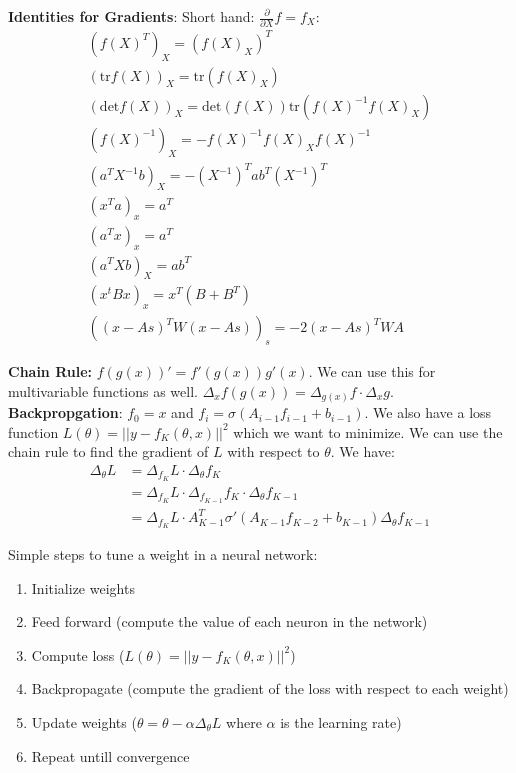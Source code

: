 \documentclass[answers,12pt,addpoints]{exam}
\begin{document}
\textbf{Identities for Gradients}: Short hand: $\frac{\partial}{\partial X} f = f_X$:
\begin{align*}
    (f(X)^T)_X = (f(X)_X)^T \\
    (\text{tr}f(X))_X = \text{tr}(f(X)_X) \\
    (\text{det}f(X))_X = \text{det}(f(X))\text{tr}(f(X)^{-1} f(X)_X) \\
    (f(X)^{-1})_X = -f(X)^{-1} f(X)_X f(X)^{-1} \\
    (a^T X^{-1}b)_X = -(X^{-1})^T ab^T (X^{-1})^T\\
    (x^T a)_x = a^T \\
    (a^T x)_x = a^T\\
    (a^T X b)_X = ab^T \\
    (x^t B x)_x = x^T(B + B^T)\\
    ((x-As)^T W (x-As))_s = -2(x-As)^T W A 
\end{align*}

\textbf{Chain Rule:} $f(g(x))'  = f'(g(x))g'(x)$. We can use this for multivariable functions as well. $\Delta_x f(g(x)) = \Delta_{g(x)} f \cdot \Delta_x g$.\\

\textbf{Backpropgation}: $f_0 =x$ and $f_i = \sigma(A_{i-1}f_{i-1} + b_{i-1})$. We also have a loss function $L(\theta) = ||y - f_K(\theta, x)||^2$ which we want to minimize. We can use the chain rule to find the gradient of $L$ with respect to $\theta$. We have:
\begin{align*}
    \Delta_{\theta} L &= \Delta_{f_K} L \cdot \Delta_{\theta} f_K \\
    &= \Delta_{f_K} L \cdot \Delta_{f_{K-1}} f_K \cdot \Delta_{\theta} f_{K-1} \\
    &= \Delta_{f_K} L \cdot A_{K-1}^T \sigma'(A_{K-1}f_{K-2} + b_{K-1})\Delta_{\theta} f_{K-1}
\end{align*}

\begin{example}
    Simple steps to tune a weight in a neural network:
    \begin{enumerate}
        \item Initialize weights 
        \item Feed forward (compute the value of each neuron in the network)
        \item Compute loss ($L(\theta) = ||y - f_K(\theta, x)||^2$)
        \item Backpropagate (compute the gradient of the loss with respect to each weight)
        \item Update weights ($\theta = \theta - \alpha \Delta_{\theta} L$ where $\alpha$ is the learning rate)
        \item Repeat untill convergence
    \end{enumerate}
\end{example}
\end{document}
